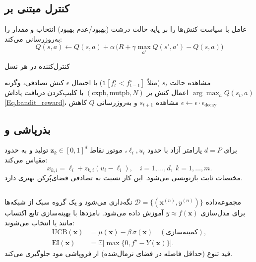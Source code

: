 \subsection{کنترل مبتنی بر }
عامل  با سیاست  کنش‌ها را بر پایه حالت درشت (بهبود/عدم بهبود) انتخاب و مقدار  را به‌روزرسانی می‌کند:
\begin{equation}
 Q(s,a)\leftarrow Q(s,a)+\alpha\,\big(R+\gamma\max_{a'}Q(s',a')-Q(s,a)\big)
\end{equation}
\begin{algorithm}[H]
\caption{کنترل‌کننده  در هر نسل}
\begin{algorithmic}[1]
\STATE مشاهده حالت $s_t$ (مثلاً $\mathbb{1}[f^{\star}_t<f^{\star}_{t-1}]$)
\STATE با احتمال $\epsilon$ کنش تصادفی، وگرنه $\arg\max_a Q(s_t,a)$
\STATE اعمال کنش بر $(\text{cxpb},\text{mutpb},N)$ با کلیپ‌کردن
\STATE دریافت پاداش \eqref{Eq.bandit_reward}، مشاهده $s_{t+1}$ و به‌روزرسانی $Q$
\STATE کاهش $\epsilon\leftarrow\epsilon\cdot\epsilon_{\text{decay}}$
\end{algorithmic}
\end{algorithm}

\subsection{بذرپاشی  و }
برای $d=P$ پارامتر آزاد با حدود $\ell_i,u_i$، موتور  نقاط $\mathbf{z}_k\in[0,1]^d$ تولید و به حدود مقیاس می‌کند:
\begin{equation}
 x_{k,i}=\ell_i+z_{k,i}(u_i-\ell_i),\quad i=1,\dots,d,\;k=1,\dots,m.
\end{equation}
مختصات ثابت بازنویسی می‌شود. این کار نسبت به تصادفی فضای‌پُرکن بهتری دارد.

\subsection{}
مجموعه‌داده $\mathcal{D}=\{(\mathbf{x}^{(n)}, y^{(n)})\}$ نگه‌داری می‌شود و یک گروه سبک از شبکه‌ها برای مدل‌سازی $y\approx f(\mathbf{x})$ آموزش داده می‌شود. نامزدها با بهینه‌سازی تابع اکتساب مانند  یا  انتخاب می‌شوند:
\begin{align}\label{eq:UCBEI}
 \text{UCB}(\mathbf{x}) &= \mu(\mathbf{x}) - \beta\,\sigma(\mathbf{x}) \quad (\text{کمینه‌سازی}),\\
 \text{EI}(\mathbf{x}) &= \mathbb{E}\big[\max\{0, f^{\star}-Y(\mathbf{x})\}\big].
\end{align}
قید تنوع (حداقل فاصله در فضای نرمال‌شده) از فروپاشی مود جلوگیری می‌کند.

